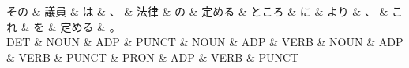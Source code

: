 \documentclass[tikz,border=5pt]{standalone}
\begin{document}
\normalsize
\begin{dependency}[edge unit distance=12.0pt]
    \begin{deptext}[column sep=1em]
        その \& 議員 \& は \& 、 \& 法律 \& の \& 定める \& ところ \& に \& より \& 、 \& これ \& を \& 定める \& 。\\
        DET \& NOUN \& ADP \& PUNCT \& NOUN \& ADP \& VERB \& NOUN \& ADP \& VERB \& PUNCT \& PRON \& ADP \& VERB \& PUNCT\\
    \end{deptext}
\end{dependency}
\end{document}

